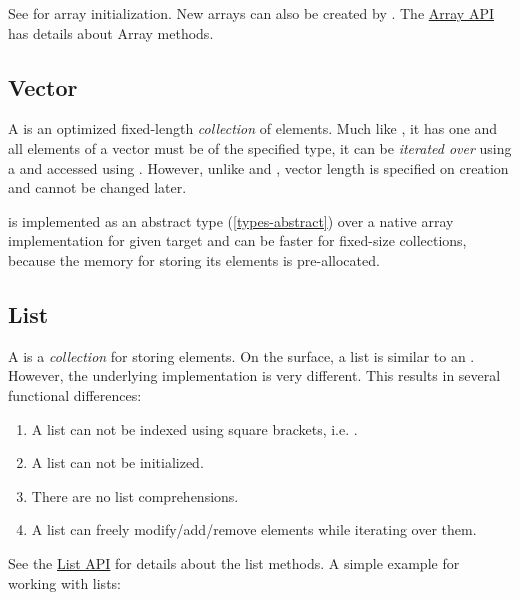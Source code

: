 See  for array initialization.  New arrays can also be created by .  The \href{http://api.haxe.org/Array.html}{Array API} has details about Array methods.

\subsection{Vector}
\label{std-vector}

A  is an optimized fixed-length \emph{collection} of elements. Much like , it has one  and all elements of a vector must be of the specified type, it can be \emph{iterated over} using a  and accessed using . However, unlike  and , vector length is specified on creation and cannot be changed later.


 is implemented as an abstract type (\ref{types-abstract}) over a native array implementation for given target and can be faster for fixed-size collections, because the memory for storing its elements is pre-allocated.

\subsection{List}
\label{std-List}
A  is a \emph{collection} for storing elements.  On the surface, a list is similar to an .  However, the underlying implementation is very different.  This results in several functional differences:
\begin{enumerate}
	\item A list can not be indexed using square brackets, i.e. \expr{[0]}.
	\item A list can not be initialized.
	\item There are no list comprehensions.
	\item A list can freely modify/add/remove elements while iterating over them.
\end{enumerate}

See the \href{http://api.haxe.org/List.html}{List API} for details about the list methods.  A simple example for working with lists:

